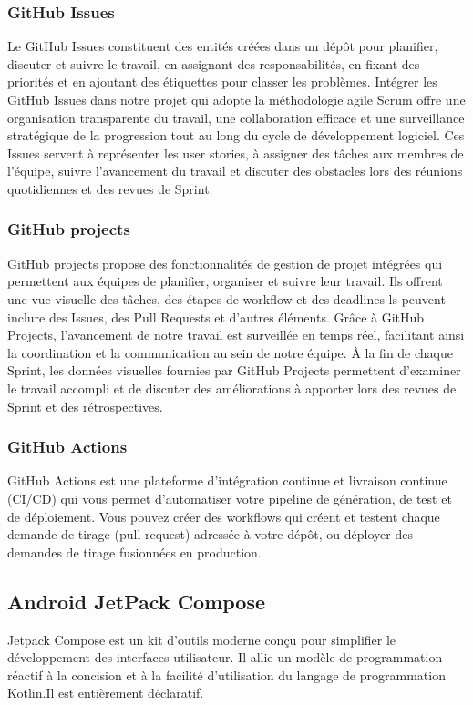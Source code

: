 \subsubsection{GitHub Issues}
Le GitHub Issues constituent des entités créées  dans un dépôt pour planifier, discuter et suivre le travail, en assignant des responsabilités, en fixant des priorités et en ajoutant des étiquettes pour classer les problèmes.
Intégrer les GitHub Issues dans notre projet qui adopte la méthodologie agile Scrum offre une organisation transparente du travail, une collaboration efficace et une surveillance stratégique de la progression tout au long du cycle de développement logiciel. Ces Issues servent à représenter les user stories, à assigner des tâches aux membres de l'équipe, suivre l'avancement du travail et discuter des obstacles lors des réunions quotidiennes et des revues de Sprint.
\cite{githubProposGitHub}
\subsubsection{GitHub projects}
GitHub projects propose des fonctionnalités de gestion de projet intégrées qui permettent aux équipes de planifier, organiser et suivre leur travail. Ils offrent une vue visuelle des tâches, des étapes de workflow et des deadlines ls peuvent inclure des Issues, des Pull Requests et d'autres éléments.
Grâce à GitHub Projects, l'avancement de notre travail est surveillée  en temps réel, facilitant ainsi la coordination et la communication au sein de notre équipe. À la fin de chaque Sprint, les données visuelles fournies par GitHub Projects permettent d'examiner le travail accompli et de discuter des améliorations à apporter lors des revues de Sprint et des rétrospectives.
\subsubsection{GitHub Actions}
GitHub Actions est une plateforme d'intégration continue et livraison continue (CI/CD) qui vous permet d'automatiser votre pipeline de génération, de test et de déploiement. Vous pouvez créer des workflows qui créent et testent chaque demande de tirage (pull request) adressée à votre dépôt, ou déployer des demandes de tirage fusionnées en production.
\cite{ComprendreGitHub}

\subsection{Android JetPack Compose}
Jetpack Compose est un kit d'outils moderne conçu pour simplifier le développement des interfaces utilisateur. Il allie un modèle de programmation réactif à la concision et à la facilité d'utilisation du langage de programmation Kotlin.Il est entièrement déclaratif.

